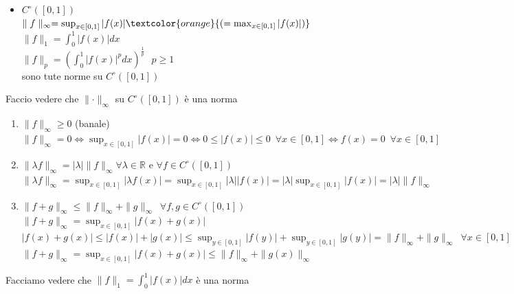 \documentclass{article}
\newcommand{\R}{\mathbb{R}}
\begin{document}
\begin{itemize}
    \item $C^\circ([0,1])$\\
    $\parallel f\parallel_\infty = \sup_{x \in [0,1]} |f(x)| \textcolor{orange}{(=\max_{x \in [0,1]} |f(x)|)}$\\
    $\parallel f\parallel_1=\int_{0}^{1} |f(x)|dx$\\
    $\parallel f\parallel_p= \left( \int_{0}^{1} |f(x)|^p dx\right)^{\frac{1}{p}}\,\,\,\, p \geq 1$\\
    sono tute norme su $C^\circ([0,1])$
\end{itemize}
Faccio vedere che $\parallel\cdot\parallel_\infty$ su $C^\circ([0,1])$ è una norma
\begin{enumerate}
    \item $\parallel f\parallel_\infty \geq 0$ (banale)\\
          $\parallel f\parallel_\infty =  0 \Leftrightarrow \sup_{x \in [0,1]}|f(x)|=0 \Leftrightarrow 0 \leq |f(x)| \leq0 \,\,\, \forall x \in[0,1] \Leftrightarrow f(x)=0\,\,\, \forall x\in[0,1]$
    \item $\parallel \lambda f\parallel_\infty = |\lambda|\parallel f\parallel_\infty \forall \lambda \in \R$ e $\forall f \in C^\circ([0,1])$\\
         $\parallel \lambda f\parallel_\infty = \sup_{x \in[0,1]}|\lambda f(x)|=\sup_{x\in[0,1]}|\lambda||f(x)|=|\lambda|\sup_{x\in[0,1]}|f(x)|=|\lambda|\parallel f\parallel_\infty$
    \item $\parallel f+g\parallel_\infty \leq \parallel f\parallel_\infty + \parallel g\parallel_\infty \,\,\, \forall f,g \in C^\circ([0,1])$\\
          $\parallel f+g\parallel_\infty = \sup_{x\in[0,1]} |f(x)+g(x)|$\\
          $|f(x)+g(x)| \leq |f(x)|+|g(x)|\leq \sup_{y\in[0,1]} |f(y)|+\sup_{y\in[0,1]} |g(y)|= \parallel f\parallel_\infty + \parallel g\parallel_\infty \,\,\, \forall x \in [0,1]$\\
          $\parallel f+g\parallel_\infty = \sup_{x\in[0,1]} |f(x)+g(x)|\leq \parallel f\parallel_\infty + \parallel g(x)\parallel_\infty$\\
\end{enumerate}
Facciamo vedere che $\parallel f\parallel_1 = \int_{0}^{1}|f(x)|dx$ è una norma
\end{document}
